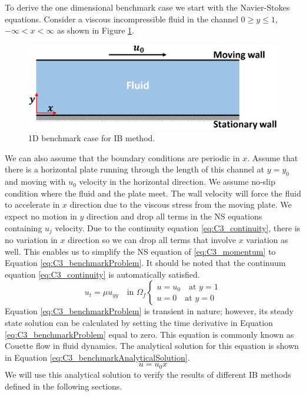 To derive the one dimensional benchmark case we start with the Navier-Stokes equations. Consider a viscous incompressible fluid in the channel $0 \geq y \leq 1$, $-\infty < x < \infty$ as shown in Figure \ref{fig:C3_benchmarkCase}.
%
\begin{figure}[H]
    \centering
    \includegraphics[width=14.00cm]{Chapter_3/figure/C3_infinite_channel.png}
    \caption{1D benchmark case for IB method.}
    \label{fig:C3_benchmarkCase}
\end{figure}
%
We can also assume that the boundary conditions are periodic in $x$. Assume that there is a horizontal plate running through the length of this channel at $y=y_0$ and moving with $u_0$ velocity in the horizontal direction. We assume no-slip condition where the fluid and the plate meet. The wall velocity will force the fluid to accelerate in $x$ direction due to the viscous stress from the moving plate. We expect no motion in $y$ direction and drop all terms in the NS equations containing $u_j$ velocity. Due to the continuity equation \eqref{eq:C3_continuity}, there is no variation in $x$ direction so we can drop all terms that involve $x$ variation as well. This enables us to simplify the NS equation of \eqref{eq:C3_momentum} to Equation \eqref{eq:C3_benchmarkProblem}. It should be noted that the continuum equation \eqref{eq:C3_continuity} is automatically satisfied.
%
\begin{subequations}\label{eq:C3_benchmarkProblem}
\begin{equation}
    u_t = \mu u_{yy} \quad \text{in } \Omega_f
\end{equation}
\begin{equation}
\begin{cases}
    u = u_0 \quad \text{at } y = 1 \\
    u = 0 \quad \text{at } y = 0
\end{cases}
\end{equation}
\end{subequations}
%
Equation \eqref{eq:C3_benchmarkProblem} is transient in nature; however, its steady state solution can be calculated by setting the time derivative in Equation \eqref{eq:C3_benchmarkProblem} equal to zero. This equation is commonly known as Couette flow in fluid dynamics. The analytical solution for this equation is shown in Equation \eqref{eq:C3_benchmarkAnalyticalSolution}.
%
\begin{equation}\label{eq:C3_benchmarkAnalyticalSolution}
    u = u_0 x
\end{equation}
%
We will use this analytical solution to verify the results of different IB methods defined in the following sections.

